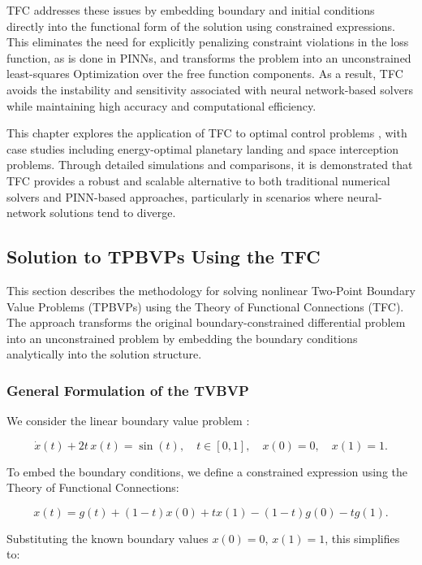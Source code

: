 \documentclass[
  number,
  preprint]{elsarticle}
\begin{document}
TFC addresses these issues by embedding boundary and initial conditions
directly into the functional form of the solution using constrained
expressions. This eliminates the need for explicitly penalizing
constraint violations in the loss function, as is done in PINNs, and
transforms the problem into an unconstrained least-squares Optimization
over the free function components. As a result, TFC avoids the
instability and sensitivity associated with neural network-based solvers
while maintaining high accuracy and computational efficiency.

This chapter explores the application of TFC to optimal control problems
\citep{furfaro2020least}, with case studies including energy-optimal
planetary landing and space interception problems. Through detailed
simulations and comparisons, it is demonstrated that TFC provides a
robust and scalable alternative to both traditional numerical solvers
and PINN-based approaches, particularly in scenarios where
neural-network solutions tend to diverge.

\subsection{Solution to TPBVPs Using the
TFC}\label{solution-to-tpbvps-using-the-tfc}

This section describes the methodology for solving nonlinear Two-Point
Boundary Value Problems (TPBVPs) using the Theory of Functional
Connections (TFC). The approach transforms the original
boundary-constrained differential problem into an unconstrained problem
by embedding the boundary conditions analytically into the solution
structure.

\subsubsection{General Formulation of the
TVBVP}\label{general-formulation-of-the-tvbvp}

We consider the linear boundary value problem \citep{furfaro2020least}:

\[
\dot{x}(t) + 2t\,x(t) = \sin(t), \quad t \in [0, 1], \quad x(0) = 0,\quad x(1) = 1.
\]

To embed the boundary conditions, we define a constrained expression
using the Theory of Functional Connections:

\[
x(t) = g(t) + (1 - t)x(0) + t x(1) - (1 - t) g(0) - t g(1).
\]

Substituting the known boundary values \(x(0) = 0\), \(x(1) = 1\), this
simplifies to:
\end{document}
